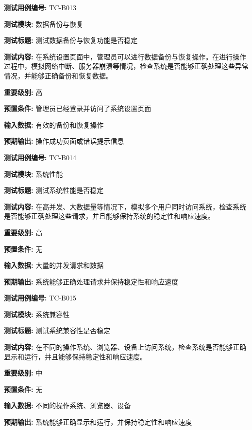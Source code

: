 \begin{framed} \textbf{测试用例编号:} TC-B013

\textbf{测试模块:} 数据备份与恢复

\textbf{测试标题:} 测试数据备份与恢复功能是否稳定

\textbf{测试内容:} 在系统设置页面中，管理员可以进行数据备份与恢复操作。在进行操作过程中，模拟网络中断、服务器崩溃等情况，检查系统是否能够正确处理这些异常情况，并能够正确备份和恢复数据。

\textbf{重要级别:} 高

\textbf{预置条件:} 管理员已经登录并访问了系统设置页面

\textbf{输入数据:} 有效的备份和恢复操作

\textbf{预期输出:} 操作成功页面或错误提示信息

\begin{center}  \end{center} \end{framed}

\begin{framed} \textbf{测试用例编号:} TC-B014

\textbf{测试模块:} 系统性能

\textbf{测试标题:} 测试系统性能是否稳定

\textbf{测试内容:} 在高并发、大数据量等情况下，模拟多个用户同时访问系统，检查系统是否能够正确处理这些请求，并且能够保持系统的稳定性和响应速度。

\textbf{重要级别:} 高

\textbf{预置条件:} 无

\textbf{输入数据:} 大量的并发请求和数据

\textbf{预期输出:} 系统能够正确处理请求并保持稳定性和响应速度

\begin{center}  \end{center} \end{framed}

\begin{framed} \textbf{测试用例编号:} TC-B015

\textbf{测试模块:} 系统兼容性

\textbf{测试标题:} 测试系统兼容性是否稳定

\textbf{测试内容:} 在不同的操作系统、浏览器、设备上访问系统，检查系统是否能够正确显示和运行，并且能够保持稳定性和响应速度。

\textbf{重要级别:} 中

\textbf{预置条件:} 无

\textbf{输入数据:} 不同的操作系统、浏览器、设备

\textbf{预期输出:} 系统能够正确显示和运行，并保持稳定性和响应速度

\begin{center}  \end{center} \end{framed}